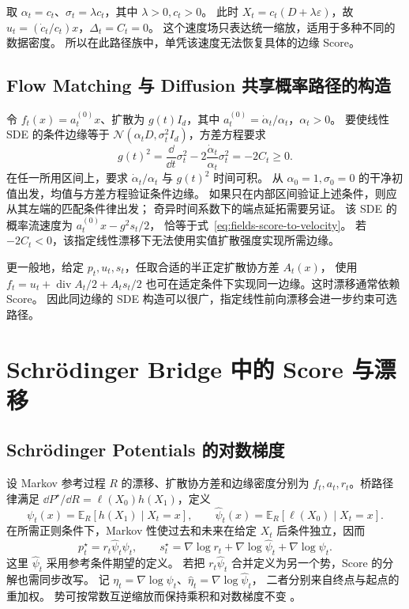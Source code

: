 \begin{example}[固定信噪比造成的退化]
取 \(\alpha_t=c_t\)、\(\sigma_t=\lambda c_t\)，其中 \(\lambda>0,c_t>0\)。
此时 \(X_t=c_t(D+\lambda\varepsilon)\)，故
\(u_t=(\dot c_t/c_t)x\)，\(\Delta_t=C_t=0\)。
这个速度场只表达统一缩放，适用于多种不同的数据密度。
所以在此路径族中，单凭该速度无法恢复具体的边缘 Score。
\end{example}

\subsection{Flow Matching 与 Diffusion 共享概率路径的构造}

令 \(f_t(x)=a_t^{(0)}x\)、扩散为 \(g(t)I_d\)，其中
\(a_t^{(0)}=\dot\alpha_t/\alpha_t\)，\(\alpha_t>0\)。
要使线性 SDE 的条件边缘等于
\(\mathcal N(\alpha_tD,\sigma_t^2I_d)\)，方差方程要求
\begin{equation}
 g(t)^2=\frac{\dd}{\dd t}\sigma_t^2
             -2\frac{\dot\alpha_t}{\alpha_t}\sigma_t^2=-2C_t\ge0.
 \label{eq:fields-gaussian-diffusion-realization}
\end{equation}
在任一所用区间上，要求 \(\dot\alpha_t/\alpha_t\) 与 \(g(t)^2\) 时间可积。
从 \(\alpha_0=1,\sigma_0=0\) 的干净初值出发，均值与方差方程验证条件边缘。
如果只在内部区间验证上述条件，则应从其左端的匹配条件律出发；
奇异时间系数下的端点延拓需要另证。
该 SDE 的概率流速度为 \(a_t^{(0)}x-g^2s_t/2\)，
恰等于式~\eqref{eq:fields-score-to-velocity}。
若 \(-2C_t<0\)，该指定线性漂移下无法使用实值扩散强度实现所需边缘。

更一般地，给定 \(p_t,u_t,s_t\)，任取合适的半正定扩散协方差 \(A_t(x)\)，
使用 \(f_t=u_t+\operatorname{div}A_t/2+A_ts_t/2\)
也可在适定条件下实现同一边缘。这时漂移通常依赖 Score。
因此同边缘的 SDE 构造可以很广，指定线性前向漂移会进一步约束可选路径。

\section{Schrödinger Bridge 中的 Score 与漂移}
\label{sec:fields-bridge}

\subsection{Schrödinger Potentials 的对数梯度}

设 Markov 参考过程 \(R\) 的漂移、扩散协方差和边缘密度分别为
\(f_t,a_t,r_t\)。桥路径律满足
\(\dd P^\star/\dd R=\ell(X_0)h(X_1)\)，定义
\[
 \psi_t(x)=\mathbb E_R[h(X_1)\mid X_t=x],\qquad
 \widehat\psi_t(x)=\mathbb E_R[\ell(X_0)\mid X_t=x].
\]
在所需正则条件下，Markov 性使过去和未来在给定 \(X_t\) 后条件独立，因而
\begin{equation}
 p_t^\star=r_t\widehat\psi_t\psi_t,\qquad
 s_t^\star=\nabla\log r_t+\nabla\log\widehat\psi_t+\nabla\log\psi_t.
 \label{eq:fields-bridge-score}
\end{equation}
这里 \(\widehat\psi_t\) 采用参考条件期望的定义。
若把 \(r_t\widehat\psi_t\) 合并定义为另一个势，Score 的分解也需同步改写。
记 \(\eta_t=\nabla\log\psi_t\)、\(\widehat\eta_t=\nabla\log\widehat\psi_t\)，
二者分别来自终点与起点的重加权。
势可按常数互逆缩放而保持乘积和对数梯度不变
\cite{leonard2014schrodinger}。

